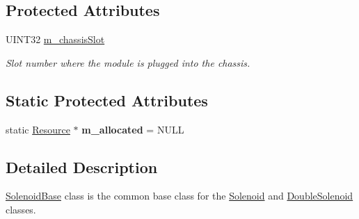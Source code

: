 \subsection*{\-Protected \-Attributes}
\begin{DoxyCompactItemize}
\item 
\hypertarget{classSolenoidBase_a47cff309cb2d2bc82cc2721a1c93ba92}{\-U\-I\-N\-T32 \hyperlink{classSolenoidBase_a47cff309cb2d2bc82cc2721a1c93ba92}{m\-\_\-chassis\-Slot}}\label{classSolenoidBase_a47cff309cb2d2bc82cc2721a1c93ba92}

\begin{DoxyCompactList}\small\item\em \-Slot number where the module is plugged into the chassis. \end{DoxyCompactList}\end{DoxyCompactItemize}
\subsection*{\-Static \-Protected \-Attributes}
\begin{DoxyCompactItemize}
\item 
\hypertarget{classSolenoidBase_aea1b158d126f24e89dc145871511e35c}{static \hyperlink{classResource}{\-Resource} $\ast$ {\bfseries m\-\_\-allocated} = \-N\-U\-L\-L}\label{classSolenoidBase_aea1b158d126f24e89dc145871511e35c}

\end{DoxyCompactItemize}


\subsection{\-Detailed \-Description}
\hyperlink{classSolenoidBase}{\-Solenoid\-Base} class is the common base class for the \hyperlink{classSolenoid}{\-Solenoid} and \hyperlink{classDoubleSolenoid}{\-Double\-Solenoid} classes. 

